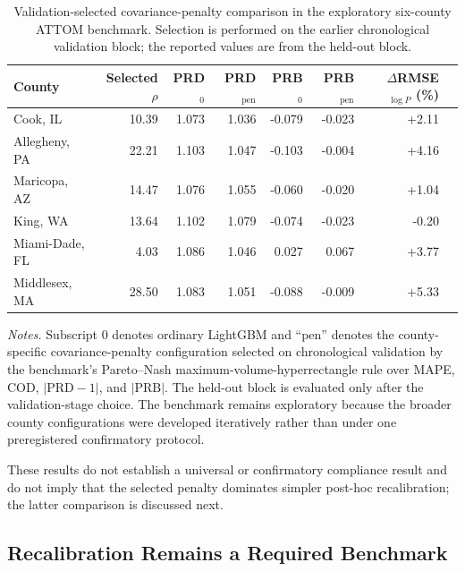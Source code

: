 \documentclass[10pt]{article}
\theoremstyle{definition}
\newcommand{\1}{\mathbf{1}}
\newcommand{\newtext}[1]{\textcolor{impGreen}{#1}}
\begin{document}
{\color{impGreen}
\begin{table}[!htbp]
\centering
\scriptsize
\setlength{\tabcolsep}{4.0pt}
\renewcommand{\arraystretch}{1.06}
\caption{Validation-selected covariance-penalty comparison in the exploratory six-county ATTOM benchmark. Selection is performed on the earlier chronological validation block; the reported values are from the held-out block.}
\label{tab:attom_selected_penalty}
\begin{tabular}{lrrrrrrr}
\toprule
County & Selected $\rho$ & PRD$_0$ & PRD$_{\mathrm{pen}}$ & PRB$_0$ & PRB$_{\mathrm{pen}}$ & $\Delta$RMSE$_{\log P}$ (\%) \\
\midrule
Cook, IL & 10.39 & 1.073 & 1.036 & -0.079 & -0.023 & +2.11 \\
Allegheny, PA & 22.21 & 1.103 & 1.047 & -0.103 & -0.004 & +4.16 \\
Maricopa, AZ & 14.47 & 1.076 & 1.055 & -0.060 & -0.020 & +1.04 \\
King, WA & 13.64 & 1.102 & 1.079 & -0.074 & -0.023 & -0.20 \\
Miami-Dade, FL & 4.03 & 1.086 & 1.046 & 0.027 & 0.067 & +3.77 \\
Middlesex, MA & 28.50 & 1.083 & 1.051 & -0.088 & -0.009 & +5.33 \\
\bottomrule
\end{tabular}
\vspace{1mm}
\begin{minipage}{0.98\textwidth}
\scriptsize
\emph{Notes.} Subscript $0$ denotes ordinary LightGBM and ``pen'' denotes the county-specific covariance-penalty configuration selected on chronological validation by the benchmark's Pareto--Nash maximum-volume-hyperrectangle rule over MAPE, COD, $|\mathrm{PRD}-1|$, and $|\mathrm{PRB}|$. The held-out block is evaluated only after the validation-stage choice. The benchmark remains exploratory because the broader county configurations were developed iteratively rather than under one preregistered confirmatory protocol.
\end{minipage}
\end{table}
}

\newtext{These results do not establish a universal or confirmatory compliance result and do not imply that the selected penalty dominates simpler post-hoc recalibration; the latter comparison is discussed next.}

\subsection{ \newtext{Recalibration Remains a Required Benchmark}}
\label{subsec:scaling_results}
\end{document}
